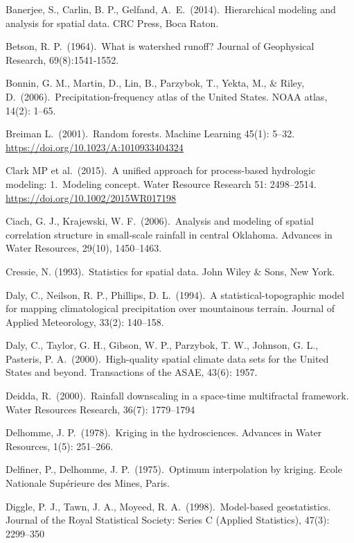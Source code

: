 \documentclass{svjour3}
\renewcommand\hl[1]{#1}
\begin{document}
\begin{thebibliography}{9}
Banerjee, S., Carlin, B. P.,  Gelfand, A.\ E.\ (2014).\ Hierarchical modeling and analysis for spatial data.
CRC Press, Boca Raton.

Betson, R. P.\ (1964).\ What is watershed runoff?
Journal of Geophysical Research, 69(8):1541-1552.

Bonnin, G. M., Martin, D., Lin, B., Parzybok, T., Yekta, M., \& Riley, D.\ (2006).\
Precipitation-frequency atlas of the United States.
NOAA atlas, 14(2): 1--65.

\hl{Breiman} L.\ (2001).\ Random forests.
Machine Learning 45(1): 5--32.
\url{https://doi.org/10.1023/A:1010933404324}

Clark MP et al.\ (2015).\ A unified approach for process-based hydrologic modeling:
1.\ Modeling concept.
Water Resource Research 51: 2498--2514. \url{https://doi.org/10.1002/2015WR017198}

Ciach, G. J.,  Krajewski, W. F.\ (2006).\ Analysis and modeling of spatial correlation structure in small-scale rainfall in central Oklahoma.
Advances in Water Resources, 29(10), 1450--1463.

Cressie, N. (1993).\ Statistics for spatial data.
John Wiley \& Sons, New York.

Daly, C., Neilson, R. P.,  Phillips, D. L.\ (1994).\ A statistical-topographic model for mapping climatological precipitation over mountainous terrain.
Journal of Applied Meteorology, 33(2): 140--158.

Daly, C., Taylor, G. H., Gibson, W. P., Parzybok, T. W., Johnson, G. L., Pasteris, P. A.\ (2000).\
High-quality spatial climate data sets for the United States and beyond.
Transactions of the ASAE, 43(6): 1957.

Deidda, R.\ (2000).\ Rainfall downscaling in a space-time multifractal framework.
Water Resources Research, 36(7): 1779--1794

Delhomme, J. P.\ (1978).\ Kriging in the hydrosciences.
Advances in Water Resources, 1(5): 251--266.

Delfiner, P., Delhomme, J. P.\ (1975).\ Optimum interpolation by kriging.
Ecole Nationale Sup{\'e}rieure des Mines, Paris.

Diggle, P. J., Tawn, J. A., Moyeed, R. A.\ (1998).\  Model-based geostatistics.
Journal of the Royal Statistical Society: Series C (Applied Statistics), 47(3): 2299--350


\end{thebibliography}
\end{document}
